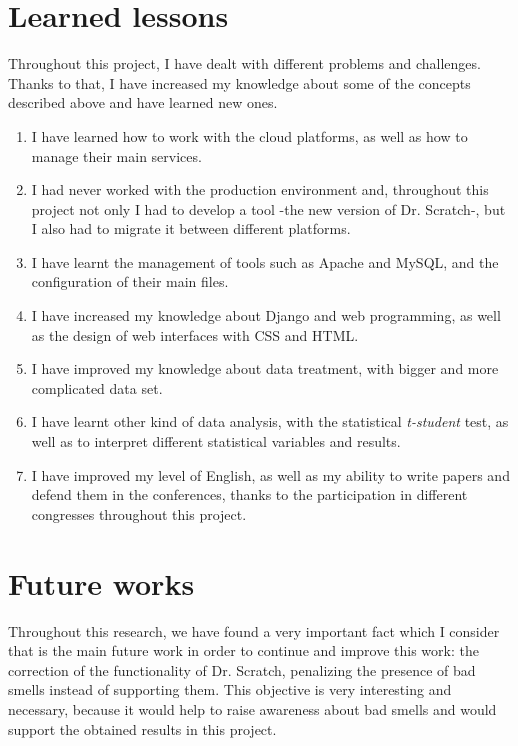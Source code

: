 \section{Learned lessons}
\label{sec:learned_lessons}

Throughout this project, I have dealt with different problems and challenges. Thanks to that, I have increased my knowledge about some of the concepts described above and have learned new ones.  

\begin{enumerate}
  \item I have learned how to work with the cloud platforms, as well as how to manage their main services. 
  \item I had never worked with the production environment and, throughout this project not only I had to develop a tool -the new version of Dr. Scratch-, but I also had to migrate it between different platforms.
  \item I have learnt the management of tools such as Apache and MySQL, and the configuration of their main files.
  \item I have increased my knowledge about Django and web programming, as well as the design of web interfaces with CSS and HTML.
  \item I have improved my knowledge about data treatment, with bigger and more complicated data set.
  \item I have learnt other kind of data analysis, with the statistical \textit{t-student} test, as well as to interpret different statistical variables and results.
  \item I have improved my level of English, as well as my ability to write papers and defend them in the conferences, thanks to the participation in different congresses throughout this project. 
\end{enumerate}


\section{Future works}
\label{sec:future_works}

Throughout this research, we have found a very important fact which I consider that is the main future work in order to continue and improve this work: the correction of the functionality of Dr. Scratch, penalizing the presence of bad smells instead of supporting them. This objective is very interesting and necessary, because it would help to raise awareness about bad smells and would support the obtained results in this project.

